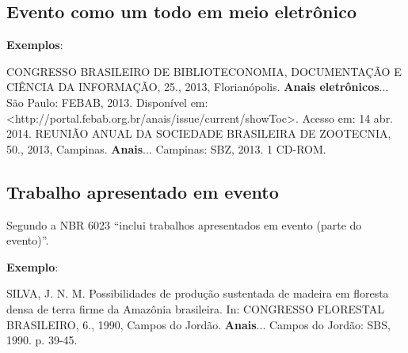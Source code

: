 \subsection{Evento como um todo em meio eletrônico}

\begin{flushleft}
\begin{singlespace}
\end{singlespace}
\end{flushleft}

\begin{exemplomanual}
\textbf{Exemplos}:\\
\begin{singlespace}
CONGRESSO BRASILEIRO DE BIBLIOTECONOMIA, DOCUMENTAÇÃO E CIÊNCIA DA INFORMAÇÃO, 25., 2013, Florianópolis. \textbf{Anais eletrônicos}... São Paulo: FEBAB, 2013. Disponível em: \\<http://portal.febab.org.br/anais/issue/current/showToc>. Acesso em: 14 abr. 2014.
\newline
\newline
REUNIÃO ANUAL DA SOCIEDADE BRASILEIRA DE ZOOTECNIA, 50., 2013, Campinas. \textbf{Anais}... Campinas: SBZ, 2013. 1 CD-ROM.
\end{singlespace}
\end{exemplomanual}


\subsection{Trabalho apresentado em evento}

Segundo a NBR 6023 \cite[p.7]{NBR6023:2002} ``inclui trabalhos apresentados em evento (parte do evento)''. 

\begin{flushleft}
\begin{singlespace}
\end{singlespace}
\end{flushleft}

\begin{exemplomanual}
\textbf{Exemplo}:\\
\begin{singlespace}
SILVA, J. N. M. Possibilidades de produção sustentada de madeira em floresta densa de terra firme da Amazônia brasileira. In: CONGRESSO FLORESTAL BRASILEIRO, 6., 1990, Campos do Jordão. \textbf{Anais}... Campos do Jordão: SBS, 1990. p. 39-45.\\
\end{singlespace}
\end{exemplomanual}


